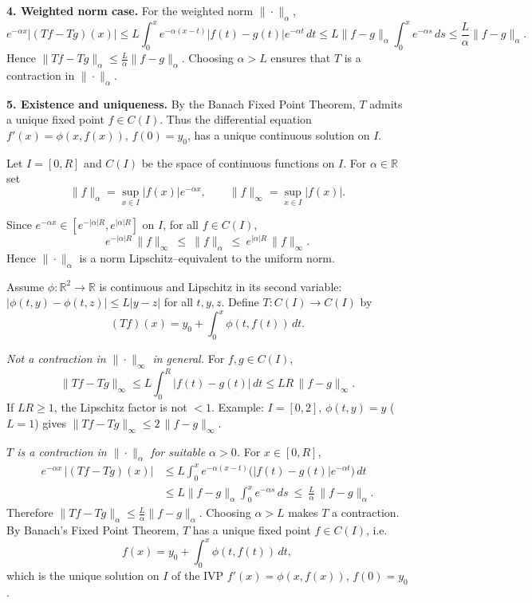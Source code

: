 \begin{problem}[CP-II-0349]
\bigskip

\textbf{4. Weighted norm case.}
For the weighted norm $\|\cdot\|_\alpha$,
\[
e^{-\alpha x}|(Tf-Tg)(x)|
\le L\int_0^x e^{-\alpha(x-t)}|f(t)-g(t)|e^{-\alpha t}\,dt
\le L\|f-g\|_\alpha \int_0^x e^{-\alpha s}\,ds
\le \frac{L}{\alpha}\|f-g\|_\alpha.
\]
Hence $\|Tf-Tg\|_\alpha\le \frac{L}{\alpha}\|f-g\|_\alpha$.
Choosing $\alpha>L$ ensures that $T$ is a contraction in $\|\cdot\|_\alpha$.

\bigskip

\textbf{5. Existence and uniqueness.}
By the Banach Fixed Point Theorem, $T$ admits a unique fixed point $f\in C(I)$.
Thus the differential equation $f'(x)=\phi(x,f(x))$, $f(0)=y_0$, has a unique continuous solution on $I$.


Let $I=[0,R]$ and $C(I)$ be the space of continuous functions on $I$. For $\alpha\in\mathbb R$ set
\[
\|f\|_\alpha=\sup_{x\in I}|f(x)|e^{-\alpha x},\qquad \|f\|_\infty=\sup_{x\in I}|f(x)|.
\]

Since $e^{-\alpha x}\in [e^{-|\alpha|R},e^{|\alpha|R}]$ on $I$, for all $f\in C(I)$,
\[
e^{-|\alpha|R}\,\|f\|_\infty \ \le\ \|f\|_\alpha \ \le\ e^{|\alpha|R}\,\|f\|_\infty.
\]
Hence $\|\cdot\|_\alpha$ is a norm Lipschitz--equivalent to the uniform norm.

Assume $\phi:\mathbb R^2\to\mathbb R$ is continuous and Lipschitz in its second variable:
$|\phi(t,y)-\phi(t,z)|\le L|y-z|$ for all $t,y,z$.
Define $T:C(I)\to C(I)$ by
\[
(Tf)(x)=y_0+\int_0^x \phi(t,f(t))\,dt .
\]

\emph{Not a contraction in $\|\cdot\|_\infty$ in general.}
For $f,g\in C(I)$,
\[
\|Tf-Tg\|_\infty\le L\!\int_0^R |f(t)-g(t)|\,dt \le LR\,\|f-g\|_\infty .
\]
If $LR\ge1$, the Lipschitz factor is not $<1$. Example: $I=[0,2]$, $\phi(t,y)=y$ ($L=1$) gives
$\|Tf-Tg\|_\infty\le 2\,\|f-g\|_\infty$.

\emph{$T$ is a contraction in $\|\cdot\|_\alpha$ for suitable $\alpha>0$.}
For $x\in[0,R]$,
\[
\begin{aligned}
	e^{-\alpha x}\,|(Tf-Tg)(x)|
	&\le L\int_0^x e^{-\alpha(x-t)}\big(|f(t)-g(t)|e^{-\alpha t}\big)\,dt \\
	&\le L\|f-g\|_\alpha \int_0^x e^{-\alpha s}\,ds
	\ \le\ \frac{L}{\alpha}\,\|f-g\|_\alpha .
\end{aligned}
\]
Therefore $\|Tf-Tg\|_\alpha \le \frac{L}{\alpha}\|f-g\|_\alpha$. Choosing $\alpha>L$ makes $T$ a contraction.
By Banach's Fixed Point Theorem, $T$ has a unique fixed point $f\in C(I)$, i.e.
\[
f(x)=y_0+\int_0^x \phi(t,f(t))\,dt ,
\]
which is the unique solution on $I$ of the IVP $f'(x)=\phi(x,f(x))$, $f(0)=y_0$.

\end{problem}

